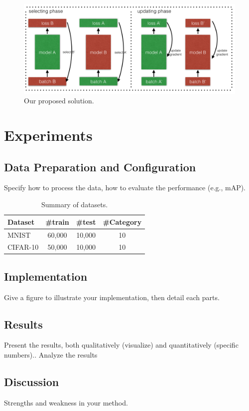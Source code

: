 \documentclass[11pt]{article}
\begin{document}
\begin{figure}[ht]
\centering
    \includegraphics[width=14cm]{figures/coteaching.png}
    \caption{Our proposed solution.}
    \label{fig:framework}
\end{figure}


\section{Experiments}
\subsection{Data Preparation and Configuration}

Specify how to process the data, how to evaluate the performance (e.g., mAP).
\begin{table}[ht]
    \centering
    \begin{tabular}{l|c|c|c}
    \hline
     Dataset & \#train & \#test & \#Category\\
    \hline
    MNIST& 60,000 & 10,000 & 10  \\
    CIFAR-10& 50,000 & 10,000 & 10 \\
    \hline
    \end{tabular}
    \caption{Summary of datasets.}
    \label{tab:dataset}
\end{table}

\subsection{Implementation}
Give a figure to illustrate your implementation, then detail each parts.

\subsection{Results}
Present the results, both qualitatively (visualize) and quantitatively (specific numbers)..
Analyze the results
\subsection{Discussion}
Strengths and weakness in your method.
\end{document}
